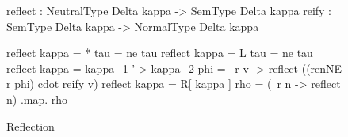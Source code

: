 \begin{figure}
\begin{agdaf}
reflect : NeutralType Delta kappa -> SemType Delta kappa 
reify   : SemType Delta kappa     -> NormalType Delta kappa

reflect {kappa = *} tau = ne tau
reflect {kappa = L} tau = ne tau
reflect {kappa = kappa_1 '-> kappa_2} phi = 
  \ r v -> reflect ((renNE r phi) cdot reify v)
reflect {kappa = R[ kappa ]} rho = (\ r n -> reflect n) .map. rho
\end{agdaf}
\caption{Reflection}
\label{fig:reflection}
\end{figure}
